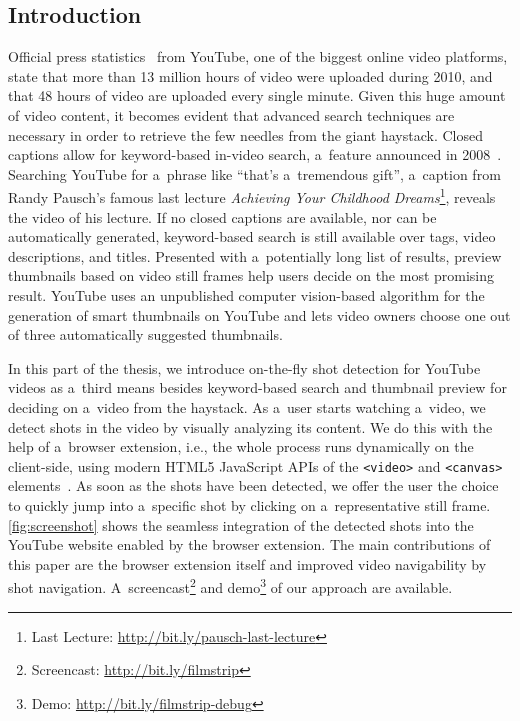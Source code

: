 \subsection{Introduction}
Official press statistics~\cite{youtube:stats} from YouTube, one of the biggest online video platforms, state that more than 13 million hours of video were uploaded during 2010, and that 48 hours of video are uploaded every single minute. Given this huge amount of video content, it becomes evident that advanced search techniques are necessary in order to retrieve the few needles from the giant haystack. Closed captions allow for keyword-based in-video search, a~feature announced in 2008~\cite{googlevideo}. Searching YouTube for a~phrase like ``that's a~tremendous gift'', a~caption from Randy Pausch's famous last lecture \emph{Achieving Your Childhood Dreams}\footnote{Last Lecture: \url{http://bit.ly/pausch-last-lecture}}, reveals the video of his lecture. If no closed captions are available, nor can be automatically generated, keyword-based search is still available over tags, video descriptions, and titles. Presented with a~potentially long list of results, preview thumbnails based on video still frames help users decide on the most promising result. YouTube uses an unpublished computer vision-based algorithm for the generation of smart thumbnails on YouTube and lets video owners choose one out of three automatically suggested thumbnails.

In this part of the thesis, we introduce on-the-fly shot detection for YouTube videos as a~third means besides keyword-based search and thumbnail preview for deciding on a~video from the haystack. As a~user starts watching a~video, we detect shots in the video by visually analyzing its content. We do this with the help of a~browser extension, i.e., the whole process runs dynamically on the client-side, using modern HTML5 JavaScript APIs of the \texttt{<video>} and \texttt{<canvas>} elements~\cite{Hickson2011}. As soon as the shots have been detected, we offer the user the choice to quickly jump into a~specific shot by clicking on a~representative still frame. \autoref{fig:screenshot} shows the seamless integration of the detected shots into the YouTube website enabled by the browser extension. The main contributions of this paper are the browser extension itself and improved video navigability by shot navigation. A~screencast\footnote{Screencast: \url{http://bit.ly/filmstrip}} and demo\footnote{Demo: \url{http://bit.ly/filmstrip-debug}} of our approach are available.

